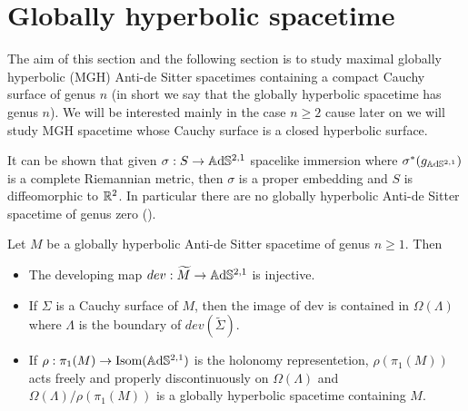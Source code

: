 

\section{Globally hyperbolic spacetime}
The aim of this section and the following section is to study maximal globally hyperbolic (MGH) Anti-de Sitter spacetimes containing a compact Cauchy surface of genus $n$ (in short we say that the globally hyperbolic spacetime has genus $n$). We will be interested mainly in the case $n\geq 2$ cause later on we will study MGH spacetime whose Cauchy surface is a closed hyperbolic surface.\\ 
\begin{observation}
    It can be shown that given $\sigma :S \to\mathbb{A}\mathrm{d}\mathbb{S}^{2,1}$ spacelike immersion where $\sigma^*(g_{\mathbb{A}\mathrm{d}\mathbb{S}^{2,1}})$ is a complete Riemannian metric, then $\sigma$ is a proper embedding and $S$ is diffeomorphic to $\mathbb{R}^2$.
    In particular there are no globally hyperbolic Anti-de Sitter spacetime of genus zero (\cite{bonsanteseppi}).
\end{observation}
\begin{proposition}\label{prop:GH_geometry}
    Let $M$ be a globally hyperbolic Anti-de Sitter spacetime of genus $n\geq 1$. Then
    \begin{itemize}
        \item The developing map $dev: \widetilde{M} \to\mathbb{A}\mathrm{d}\mathbb{S}^{2,1}$ is injective.
        \item If $\Sigma$ is a Cauchy surface of $M$, then the image of dev is contained in $\Omega(\Lambda)$ where $\Lambda$ is the boundary of $dev(\widetilde{\Sigma})$.
        \item If $\rho : \pi_1(M) \to \text{Isom}(\mathbb{A}\mathrm{d}\mathbb{S}^{2,1})$ is the holonomy representetion, $\rho(\pi_1(M))$ acts freely and properly discontinuously on $\Omega(\Lambda)$ and $\Omega(\Lambda) / \rho(\pi_1(M))$ is a globally hyperbolic spacetime containing $M$.
    \end{itemize}
\end{proposition}
